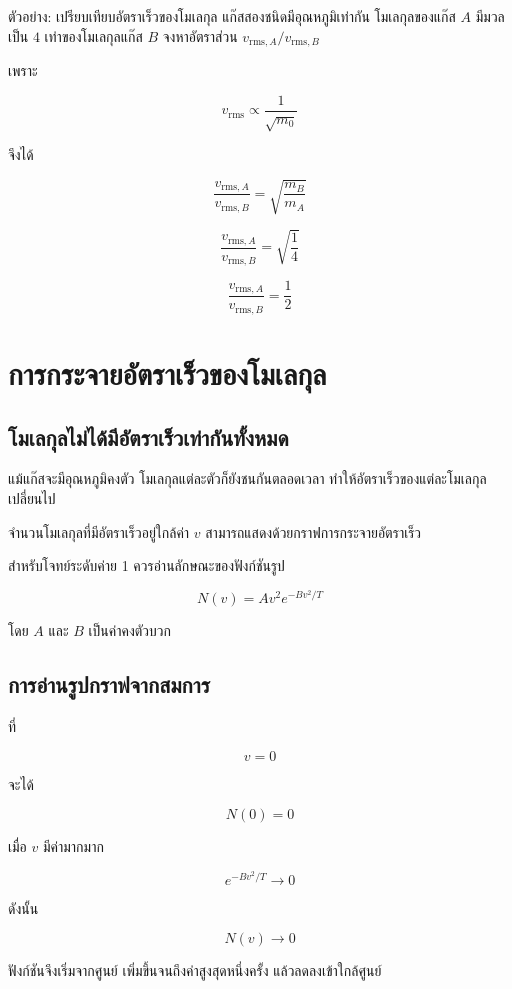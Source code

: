\begin{examplebox}{ตัวอย่าง: เปรียบเทียบอัตราเร็วของโมเลกุล}
แก๊สสองชนิดมีอุณหภูมิเท่ากัน โมเลกุลของแก๊ส $A$ มีมวลเป็น $4$ เท่าของโมเลกุลแก๊ส $B$ จงหาอัตราส่วน $v_{\text{rms},A}/v_{\text{rms},B}$

เพราะ

\[
v_{\text{rms}}\propto\frac{1}{\sqrt{m_0}}
\]

จึงได้

\[
\frac{v_{\text{rms},A}}{v_{\text{rms},B}}
=
\sqrt{\frac{m_B}{m_A}}
\]

\[
\frac{v_{\text{rms},A}}{v_{\text{rms},B}}
=
\sqrt{\frac{1}{4}}
\]

\[
\boxed{
\frac{v_{\text{rms},A}}{v_{\text{rms},B}}
=
\frac{1}{2}
}
\]
\end{examplebox}

\section{การกระจายอัตราเร็วของโมเลกุล}

\subsection{โมเลกุลไม่ได้มีอัตราเร็วเท่ากันทั้งหมด}

แม้แก๊สจะมีอุณหภูมิคงตัว โมเลกุลแต่ละตัวก็ยังชนกันตลอดเวลา ทำให้อัตราเร็วของแต่ละโมเลกุลเปลี่ยนไป

จำนวนโมเลกุลที่มีอัตราเร็วอยู่ใกล้ค่า $v$ สามารถแสดงด้วยกราฟการกระจายอัตราเร็ว

สำหรับโจทย์ระดับค่าย 1 ควรอ่านลักษณะของฟังก์ชันรูป

\[
N(v)
=
Av^2e^{-Bv^2/T}
\]

โดย $A$ และ $B$ เป็นค่าคงตัวบวก

\subsection{การอ่านรูปกราฟจากสมการ}

ที่

\[
v=0
\]

จะได้

\[
N(0)=0
\]

เมื่อ $v$ มีค่ามากมาก

\[
e^{-Bv^2/T}\longrightarrow0
\]

ดังนั้น

\[
N(v)\longrightarrow0
\]

ฟังก์ชันจึงเริ่มจากศูนย์ เพิ่มขึ้นจนถึงค่าสูงสุดหนึ่งครั้ง แล้วลดลงเข้าใกล้ศูนย์

